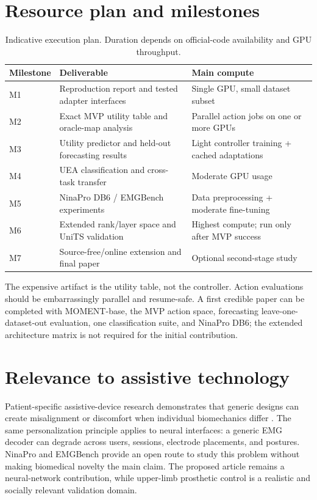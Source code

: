 \documentclass[10pt]{article}
\begin{document}
\section{Resource plan and milestones}

\begin{table}[h]
\centering
\caption{Indicative execution plan. Duration depends on official-code availability and GPU throughput.}
\begin{tabularx}{\textwidth}{L{0.12\textwidth}YY}
\toprule
Milestone & Deliverable & Main compute \\
\midrule
M1 & Reproduction report and tested adapter interfaces & Single GPU, small dataset subset \\
M2 & Exact MVP utility table and oracle-map analysis & Parallel action jobs on one or more GPUs \\
M3 & Utility predictor and held-out forecasting results & Light controller training + cached adaptations \\
M4 & UEA classification and cross-task transfer & Moderate GPU usage \\
M5 & NinaPro DB6 / EMGBench experiments & Data preprocessing + moderate fine-tuning \\
M6 & Extended rank/layer space and UniTS validation & Highest compute; run only after MVP success \\
M7 & Source-free/online extension and final paper & Optional second-stage study \\
\bottomrule
\end{tabularx}
\end{table}

The expensive artifact is the utility table, not the controller. Action evaluations should be embarrassingly parallel and resume-safe. A first credible paper can be completed with MOMENT-base, the MVP action space, forecasting leave-one-dataset-out evaluation, one classification suite, and NinaPro DB6; the extended architecture matrix is not required for the initial contribution.

\section{Relevance to assistive technology}

Patient-specific assistive-device research demonstrates that generic designs can create misalignment or discomfort when individual biomechanics differ \citep{chen2024biorob}. The same personalization principle applies to neural interfaces: a generic EMG decoder can degrade across users, sessions, electrode placements, and postures. NinaPro and EMGBench provide an open route to study this problem without making biomedical novelty the main claim. The proposed article remains a neural-network contribution, while upper-limb prosthetic control is a realistic and socially relevant validation domain.
\end{document}
